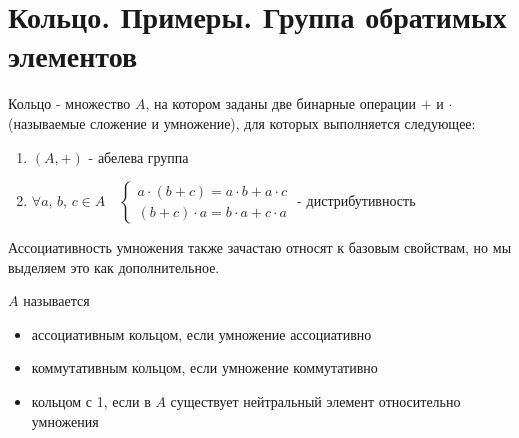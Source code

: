 \section{Кольцо. Примеры. Группа обратимых элементов}
\begin{conj}
    Кольцо - множество $A$, на котором заданы две бинарные операции $+$ и $\cdot$ (называемые сложение и умножение), для которых выполняется следующее:
\end{conj}
\begin{enumerate}
    \item $(A, +)$ - абелева группа 
    \item $\forall a,\, b,\, c \in A \quad \begin{cases} a \cdot (b + c) = a \cdot b + a \cdot c \\  (b + c) \cdot a = b \cdot a + c \cdot a \end{cases}$ - дистрибутивность
\end{enumerate}
\begin{notice}
    Ассоциативность умножения также зачастаю относят к базовым свойствам, но мы выделяем это как дополнительное.
\end{notice}
  
$A$ называется
    \begin{itemize}
        \item ассоциативным кольцом, если умножение ассоциативно
        \item коммутативным кольцом, если умножение коммутативно
        \item кольцом с 1, если в $A$ существует нейтральный элемент относительно умножения
    \end{itemize}
  
